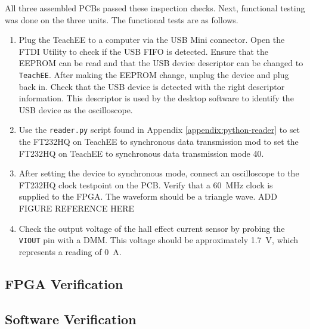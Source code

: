 \documentclass[letterpaper,11pt]{article}
\newcommand{\code}[1]{\texttt{#1}}
\begin{document}

All three assembled PCBs passed these inspection checks. Next, functional
testing was done on the three units. The functional tests are as follows.

\begin{enumerate}
  \item Plug the TeachEE to a computer via the USB Mini connector. Open the FTDI
    Utility to check if the USB FIFO is detected. Ensure that the EEPROM can be
    read and that the USB device descriptor can be changed to \code{TeachEE}.
    After making the EEPROM change, unplug the device and plug back in. Check
    that the USB device is detected with the right descriptor information. This
    descriptor is used by the desktop software to identify the USB device as the
    oscilloscope.
  \item Use the \code{reader.py} script found in Appendix
    \ref{appendix:python-reader} to set the FT232HQ on TeachEE to synchronous
    data transmission mod to set the FT232HQ on TeachEE to synchronous data
    transmission mode 40.
  \item After setting the device to synchronous mode, connect an oscilloscope to
    the FT232HQ clock testpoint on the PCB. Verify that a \SI{60}{\mega\hertz}
    clock is supplied to the FPGA. The waveform should be a triangle wave. ADD
    FIGURE REFERENCE HERE
  \item Check the output voltage of the hall effect current sensor by probing
    the \code{VIOUT} pin with a DMM. This voltage should be approximately
    \SI{1.7}{\volt}, which represents a reading of \SI{0}{\ampere}.
\end{enumerate}





\subsection{FPGA Verification} %
\subsection{Software Verification} %
\end{document}
